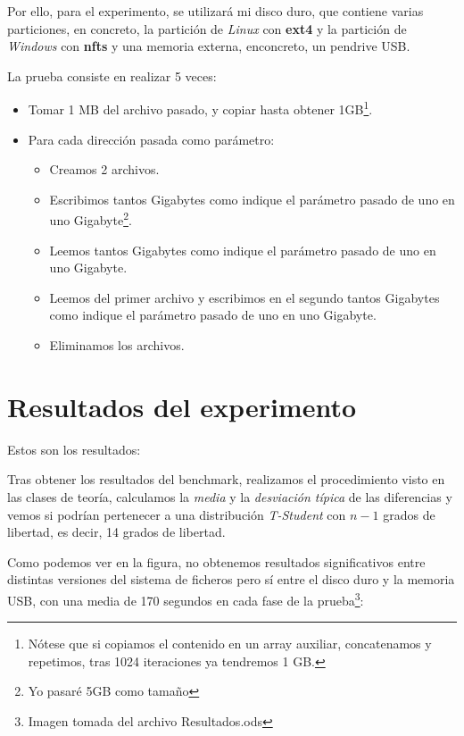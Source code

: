 \documentclass[paper=a4, fontsize=11pt]{scrartcl} %
\numberwithin{equation}{section} %
\numberwithin{figure}{section} %
\numberwithin{table}{section} %
\begin{document}
		Por ello, para el experimento, se utilizará mi disco duro, que contiene varias particiones,
		en concreto, la partición de \textit{Linux} con \textbf{ext4} y la partición de
		\textit{Windows} con \textbf{nfts} y una memoria externa, enconcreto, un pendrive USB.
		
		La prueba consiste en realizar 5 veces:
		
		\begin{itemize}
			\item Tomar 1 MB del archivo pasado, y copiar hasta obtener 1GB\footnote{Nótese que si
			copiamos el contenido en un array auxiliar, concatenamos y repetimos, tras 1024
			iteraciones ya tendremos 1 GB.}.
			
			\item Para cada dirección pasada como parámetro:
				\begin{itemize}
					\item Creamos 2 archivos.
			
					\item Escribimos tantos Gigabytes como indique el parámetro pasado de uno en
					uno Gigabyte\footnote{Yo pasaré 5GB como tamaño}.
			
					\item Leemos tantos Gigabytes como indique el parámetro pasado de uno en uno
					Gigabyte.
			
					\item Leemos del primer archivo y escribimos en el segundo tantos Gigabytes
					como indique el parámetro pasado de uno en uno Gigabyte.
								
					\item Eliminamos los archivos.
				\end{itemize}
		\end{itemize}
		
	\section{Resultados del experimento}
		Estos son los resultados:
		
		
		
		Tras obtener los resultados del benchmark, realizamos el procedimiento visto en las clases
		de teoría, calculamos la \textit{media} y la \textit{desviación típica} de las diferencias y
		vemos si podrían pertenecer a una distribución \textit{T-Student} con $n-1$ grados de
		libertad, es decir, 14 grados de libertad.
		
		Como podemos ver en la figura, no obtenemos resultados significativos entre distintas
		versiones del sistema de ficheros pero sí entre el disco duro y la memoria USB, con una
		media de 170 segundos en cada fase de la prueba\footnote{Imagen tomada del archivo
		Resultados.ods}:
		 
\end{document}
